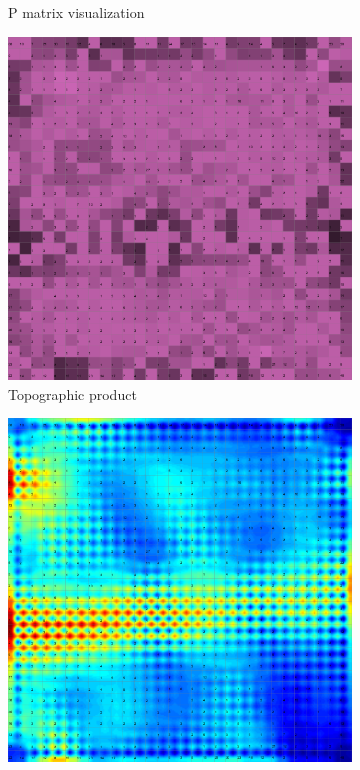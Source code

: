 \documentclass{acm_proc_article-sp}
\begin{document}
\begin{figure}
\begin{subfigure}[b]{0.45\linewidth}
    \caption{P matrix visualization}
    \label{fig:wine-big-p-matrix}
\end{subfigure}
\begin{subfigure}[b]{0.45\linewidth}
    \includegraphics[width=\linewidth]{img/wine-big-topo-product}
    \caption{Topographic product}
    \label{fig:wine-big-topo-product}
\end{subfigure}
\begin{subfigure}[b]{0.45\linewidth}
    \includegraphics[width=\linewidth]{img/wine-big-u-matrix}

\end{subfigure}
\end{figure}
\end{document}
